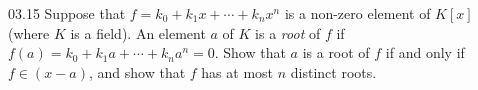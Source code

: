 \documentclass[11pt]{article}
\begin{document}
\begin{problem}{03.15}
  Suppose that $f = k_{0} + k_{1}x + \cdots + k_{n}x^{n}$ is a non-zero element
  of $K[x]$ (where $K$ is a field). An element $a$ of $K$ is a \emph{root} of
  $f$ if $f(a) = k_{0} + k_{1}a + \cdots + k_{n}a^{n} = 0$. Show that $a$ is a
  root of $f$ if and only if $f \in (x - a)$, and show that $f$ has at most $n$
  distinct roots.
\end{problem}
\end{document}
